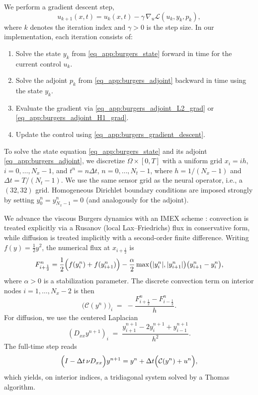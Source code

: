 \documentclass[final,1p,times]{elsarticle}
\theoremstyle{plain} %
\theoremstyle{definition} %
\theoremstyle{remark} %
\begin{document}
We perform a gradient descent step,
\begin{equation}\label{eq_app:burgers_gradient_descent}
u_{k+1}(x,t) = u_k(x,t) - \gamma\,\nabla_u \mathcal{L}(u_k,y_k,p_k),
\end{equation}
where $k$ denotes the iteration index and $\gamma>0$ is the step size. In our implementation, each
iteration consists of:
\begin{enumerate}
    \item Solve the state $y_k$ from \eqref{eq_app:burgers_state} forward in time for the current control $u_k$.
    \item Solve the adjoint $p_k$ from \eqref{eq_app:burgers_adjoint} backward in time using the state $y_k$.
    \item Evaluate the gradient via \eqref{eq_app:burgers_adjoint_L2_grad} or \eqref{eq_app:burgers_adjoint_H1_grad}.
    \item Update the control using \eqref{eq_app:burgers_gradient_descent}.
\end{enumerate}

To solve the state equation \eqref{eq_app:burgers_state} and its adjoint \eqref{eq_app:burgers_adjoint},
we discretize $\Omega\times[0,T]$ with a uniform grid
$x_i = ih$, $i=0,\dots,N_x-1$, and $t^n = n\Delta t$, $n=0,\dots,N_t-1$, where
$h = 1/(N_x-1)$ and $\Delta t = T/(N_t-1)$. We use the same sensor grid as the neural operator, i.e., a $(32,32)$ grid. Homogeneous Dirichlet boundary conditions are imposed
strongly by setting $y_0^n=y_{N_x-1}^n=0$ (and analogously for the adjoint).

We advance the viscous Burgers dynamics with an IMEX scheme \cite{AscherRuuthWetton1995}: convection is treated explicitly via a
Rusanov (local Lax--Friedrichs) flux in conservative form, while diffusion is treated implicitly
with a second-order finite difference. Writing $f(y)=\tfrac12 y^2$, the numerical flux at $x_{i+\frac12}$
is
\begin{equation}\label{eq_app:burgers_rusanov_flux}
F_{i+\frac12}^n
=\frac12\Bigl(f(y_i^n)+f(y_{i+1}^n)\Bigr)
-\frac{\alpha}{2}\max\bigl(|y_i^n|,|y_{i+1}^n|\bigr)\bigl(y_{i+1}^n-y_i^n\bigr),
\end{equation}
where $\alpha>0$ is a stabilization parameter. The discrete convection term on interior nodes
$i=1,\dots,N_x-2$ is then
\begin{equation}\label{eq_app:burgers_conv_disc}
\bigl(\mathcal{C}(y^n)\bigr)_i \;=\; -\frac{F_{i+\frac12}^n - F_{i-\frac12}^n}{h}.
\end{equation}
For diffusion, we use the centered Laplacian
\begin{equation}\label{eq_app:burgers_lap_disc}
(D_{xx} y^{n+1})_i \;=\; \frac{y_{i+1}^{n+1}-2y_i^{n+1}+y_{i-1}^{n+1}}{h^2}.
\end{equation}
The full-time step reads
\begin{equation}\label{eq_app:burgers_imex_step}
\Bigl(I - \Delta t\,\nu D_{xx}\Bigr)y^{n+1}
=
y^n + \Delta t\Bigl(\mathcal{C}(y^n) + u^n\Bigr),
\end{equation}
which yields, on interior indices, a tridiagonal system solved by a Thomas algorithm.
\end{document}
